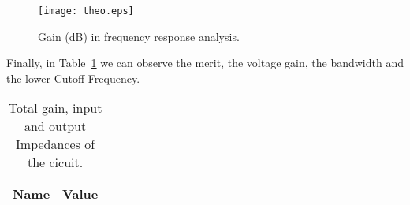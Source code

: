 
\begin{figure}[H] \centering
\texttt{[image: theo.eps]}
\caption{Gain (dB) in frequency response analysis.}
\label{fig:theo}
\end{figure}

Finally, in Table~\ref{tab:total} we can observe the merit, the voltage gain, the bandwidth and the lower Cutoff Frequency.

\begin{table}[H]
  \centering
  \begin{tabular}{|l|r|}
    \hline    
    {\bf Name} & {\bf Value} \\ \hline
	
  \end{tabular}
  \caption{Total gain, input and output Impedances of the cicuit.}
  \label{tab:total}
\end{table}

